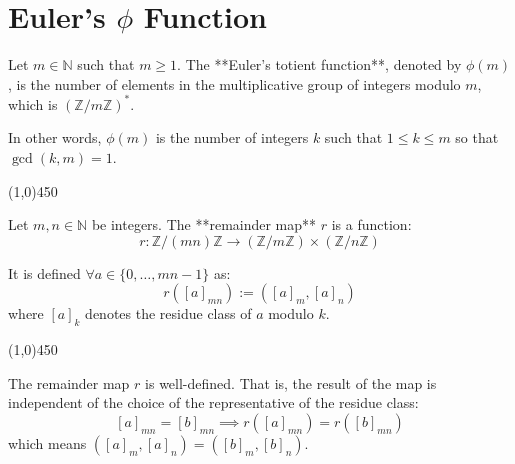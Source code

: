 \section{Euler's \texorpdfstring{$\phi$}{phi} Function}
\begin{definition}
    Let $m \in \mathbb{N}$ such that $m \ge 1$. The **Euler's totient function**, denoted by $\phi(m)$, is the number of elements in the multiplicative group of integers modulo $m$, which is $\left(\mathbb{Z}/m\mathbb{Z}\right)^*$.
    
    In other words, $\phi(m)$ is the number of integers $k$ such that $1 \le k \le m$ so that $\gcd(k, m) = 1$.
\end{definition}

\begin{center}
    \vspace{10pt}
    \line(1,0){450}
    \vspace{25pt}
\end{center}

\begin{definition}
    Let $m, n \in \mathbb{N}$ be integers. The **remainder map** $r$ is a function:
    $$r: \mathbb{Z}/(mn)\mathbb{Z} \longrightarrow (\mathbb{Z}/m\mathbb{Z}) \times (\mathbb{Z}/n\mathbb{Z})$$
    
    It is defined $\forall a \in \{0, \dots, mn - 1\}$ as:
    $$r([a]_{mn}) := ([a]_m, [a]_n)$$
    where $[a]_k$ denotes the residue class of $a$ modulo $k$.
\end{definition}

\begin{center}
    \vspace{10pt}
    \line(1,0){450}
    \vspace{25pt}
\end{center}

\bigskip

\begin{proposition}
    The remainder map $r$ is well-defined. That is, the result of the map is independent of the choice of the representative of the residue class:
    $$[a]_{mn} = [b]_{mn} \implies r([a]_{mn}) = r([b]_{mn})$$
    which means $([a]_m, [a]_n) = ([b]_m, [b]_n)$.
\end{proposition}

